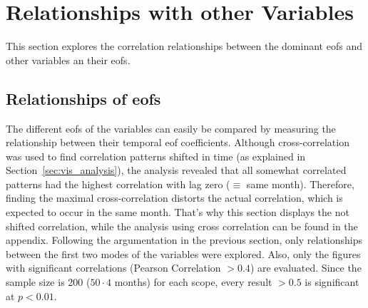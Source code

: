 
\section{Relationships with other Variables}

This section explores the correlation relationships between the dominant \acp{eof} and other variables an their \acp{eof}. 

\subsection{Relationships of \acp{eof}}

The different \acp{eof} of the variables can easily be compared by measuring the relationship between their temporal \ac{eof} coefficients. 
Although cross-correlation was used to find correlation patterns shifted in time (as explained in Section~\ref{sec:vis_analysis}), the analysis revealed that all somewhat correlated patterns had the highest correlation with lag zero ($\equiv$ same month). 
Therefore, finding the maximal cross-correlation distorts the actual correlation, which is expected to occur in the same month. 
That's why this section displays the not shifted correlation, while the analysis using cross correlation can be found in the appendix. 
Following the argumentation in the previous section, only relationships between the first two modes of the variables were explored. 
Also, only the figures with significant correlations (Pearson Correlation $> 0.4$) are evaluated. 
Since the sample size is 200 ($50 \cdot 4$ months) for each scope, every result $> 0.5$ is significant at $p < 0.01$.


%
%     
%

